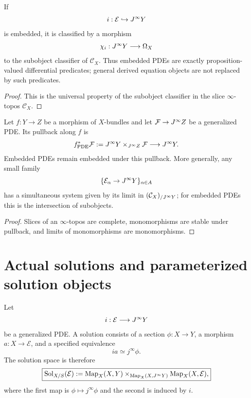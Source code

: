 \begin{proposition}
\label{prop:every-mono-equational}
If
\[
    i:\mathcal E\hookrightarrow J^{\infty} Y
\]
is embedded, it is classified by a morphism
\[
    \chi_i:J^{\infty} Y\longrightarrow\Omega_X
\]
to the subobject classifier of $\mathcal C_X$.  Thus embedded PDEs are exactly proposition-valued differential predicates; general derived equation objects are not replaced by such predicates.
\end{proposition}

\begin{proof}
This is the universal property of the subobject classifier in the slice $\infty$-topos $\mathcal C_X$.
\end{proof}

\begin{proposition}
\label{prop:pde-pullback}
\label{prop:pde-intersection}
Let $f:Y\to Z$ be a morphism of $X$-bundles and let $\mathcal F\to J^{\infty} Z$ be a generalized PDE.  Its pullback along $f$ is
\[
    f^*_{\mathrm{PDE}}\mathcal F
    :=
    J^{\infty} Y\times_{J^{\infty} Z}\mathcal F
    \longrightarrow J^{\infty} Y.
\]
Embedded PDEs remain embedded under this pullback.  More generally, any small family
\[
    \{\mathcal E_\alpha\to J^{\infty} Y\}_{\alpha\in A}
\]
has a simultaneous system given by its limit in $(\mathcal C_X)_{/J^{\infty} Y}$; for embedded PDEs this is the intersection of subobjects.
\end{proposition}

\begin{proof}
Slices of an $\infty$-topos are complete, monomorphisms are stable under pullback, and limits of monomorphisms are monomorphisms.
\end{proof}

\section{Actual solutions and parameterized solution objects}
\label{sec:pde-solutions}

\begin{definition}
\label{def:pde-solution}
\label{def:solution-space}
Let
\[
    i:\mathcal E\longrightarrow J^{\infty} Y
\]
be a generalized PDE.  A solution consists of a section $\phi:X\to Y$, a morphism $a:X\to\mathcal E$, and a specified equivalence
\[
    ia\simeq j^\infty\phi.
\]
The solution space is therefore
\[
\boxed{
\operatorname{Sol}_{X/S}(\mathcal E)
:=
\operatorname{Map}_X(X,Y)
\times_{\operatorname{Map}_X(X,J^{\infty} Y)}
\operatorname{Map}_X(X,\mathcal E),
}
\]
where the first map is $\phi\mapsto j^\infty\phi$ and the second is induced by $i$.
\end{definition}

